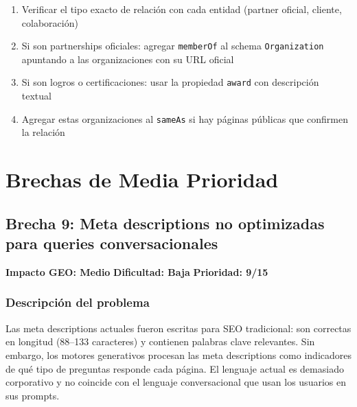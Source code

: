 \documentclass[12pt, a4paper]{article}
\begin{document}
\begin{enumerate}[itemsep=4pt]
  \item Verificar el tipo exacto de relación con cada entidad (partner oficial, cliente, colaboración)
  \item Si son partnerships oficiales: agregar \texttt{memberOf} al schema \texttt{Organization} apuntando a las organizaciones con su URL oficial
  \item Si son logros o certificaciones: usar la propiedad \texttt{award} con descripción textual
  \item Agregar estas organizaciones al \texttt{sameAs} si hay páginas públicas que confirmen la relación
\end{enumerate}

\newpage

\section{Brechas de Media Prioridad}

\subsection{Brecha 9: Meta descriptions no optimizadas para queries conversacionales}

\begin{medbox}
\textbf{Impacto GEO: Medio} \quad \textbf{Dificultad: Baja} \quad \textbf{Prioridad: 9/15}
\end{medbox}

\subsubsection{Descripción del problema}

Las meta descriptions actuales fueron escritas para SEO tradicional: son correctas en longitud (88–133 caracteres) y contienen palabras clave relevantes. Sin embargo, los motores generativos procesan las meta descriptions como indicadores de qué tipo de preguntas responde cada página. El lenguaje actual es demasiado corporativo y no coincide con el lenguaje conversacional que usan los usuarios en sus prompts.
\end{document}
